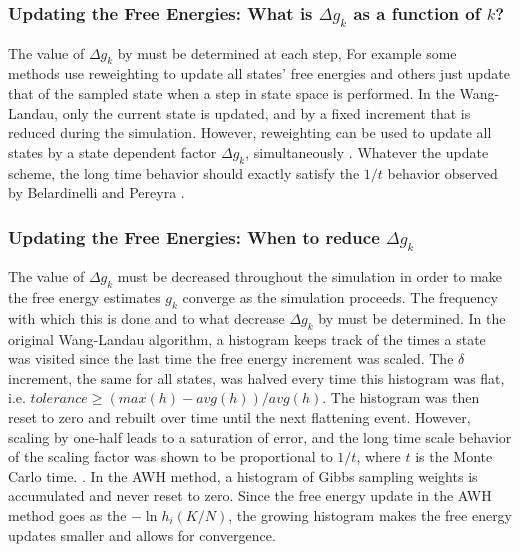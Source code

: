 \documentclass[superscriptaddress,showkeys, nofootinbib, pre, aps]{revtex4-1}
\begin{document}

\subsubsection{Updating the Free Energies: What is $\Delta g_k$ as a function of $k$?}

The value of $\Delta g_k$ by must be determined at each step, For example some methods use reweighting to update all states' free energies and others just update that of the sampled state when a step in state space is performed.  In the Wang-Landau, only the current state is updated, and by a fixed increment \cite{wang-landau:prl:2001:wang-landau} that is reduced during the simulation.  However, reweighting can be used to update all states by a state dependent factor $\Delta g_k$, simultaneously \cite{Lidmar2012}.  Whatever the update scheme, the long time behavior should exactly satisfy the $1/t$ behavior observed by Belardinelli and Pereyra \cite{Belardinelli2008,Lidmar2012}.


\subsubsection{Updating the Free Energies: When to reduce $\Delta g_k$}
The value of $\Delta g_k$ must be decreased throughout the simulation in order to make the free energy estimates $g_k$ converge as the simulation proceeds.  The frequency with which this is done and to what decrease $\Delta g_k$ by must be determined.  In the original Wang-Landau algorithm, a histogram keeps track of the times a state was visited since the last time the free energy increment was scaled.  The $\delta $ increment, the same for all states, was halved every time this histogram was flat, i.e. $tolerance \geq (max(h)-avg(h))/avg(h)$.  The histogram was then reset to zero and rebuilt over time until the next flattening event. However, scaling by one-half leads to a saturation of error, and the long time scale behavior of the scaling factor was shown to be proportional to $1/t$, where $t$ is the Monte Carlo time. \cite{Belardinelli2008}.  In the AWH method, a histogram of Gibbs sampling weights is accumulated and never reset to zero.  Since the free energy update in the AWH method goes as the $-\ln{h_i(K/N)}$, the growing histogram makes the free energy updates smaller and allows for convergence.
\end{document}
